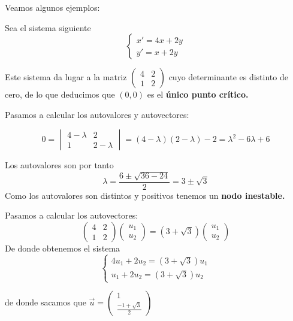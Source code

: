 Veamos algunos ejemplos:

\begin{example}
Sea el sistema siguiente
\begin{equation*}
\left\lbrace 
\begin{array}{l}
	x' = 4x+2y\\
	y'=x+2y
\end{array}
\right. 
\end{equation*}

Este sistema da lugar a la matriz $\begin{pmatrix}
4& 2\\1& 2
\end{pmatrix}$
cuyo determinante es distinto de cero, de lo que deducimos que $(0,0)$ es el \textbf{único punto crítico.}

Pasamos a calcular los autovalores y autovectores:

$$0 = \begin{vmatrix}
4-\lambda& 2\\1& 2-\lambda
\end{vmatrix} = (4-\lambda)(2-\lambda)-2 = \lambda^2-6\lambda+6$$

Los autovalores son por tanto
$$\lambda = \frac{6\pm \sqrt{36-24}}{2} = 3\pm \sqrt{3}$$
Como los autovalores son distintos y positivos tenemos un \textbf{nodo inestable.}

Pasamos a calcular los autovectores:
$$\begin{pmatrix}
4& 2\\1& 2
\end{pmatrix}\begin{pmatrix}
u_1\\ u_2
\end{pmatrix}=(3+\sqrt{3})\begin{pmatrix}
u_1\\ u_2
\end{pmatrix}$$
De donde obtenemos el sistema 
\begin{equation*}
\left\lbrace 
\begin{array}{l}
	4u_1+2u_2=(3+\sqrt{3})u_1\\
	u_1+2u_2 = (3+\sqrt{3})u_2
\end{array}
\right. 
\end{equation*}

de donde sacamos que $\vec{u} = \begin{pmatrix}
1\\\frac{-1+\sqrt{3}}{2}
\end{pmatrix}$


\end{example}
